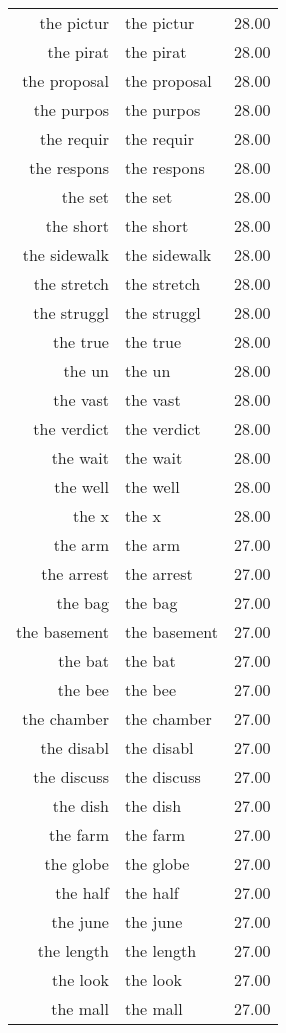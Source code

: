 \begin{table}[ht]
\begin{tabular}{rlr}
  the pictur & the pictur & 28.00 \\ 
  the pirat & the pirat & 28.00 \\ 
  the proposal & the proposal & 28.00 \\ 
  the purpos & the purpos & 28.00 \\ 
  the requir & the requir & 28.00 \\ 
  the respons & the respons & 28.00 \\ 
  the set & the set & 28.00 \\ 
  the short & the short & 28.00 \\ 
  the sidewalk & the sidewalk & 28.00 \\ 
  the stretch & the stretch & 28.00 \\ 
  the struggl & the struggl & 28.00 \\ 
  the true & the true & 28.00 \\ 
  the un & the un & 28.00 \\ 
  the vast & the vast & 28.00 \\ 
  the verdict & the verdict & 28.00 \\ 
  the wait & the wait & 28.00 \\ 
  the well & the well & 28.00 \\ 
  the x & the x & 28.00 \\ 
  the arm & the arm & 27.00 \\ 
  the arrest & the arrest & 27.00 \\ 
  the bag & the bag & 27.00 \\ 
  the basement & the basement & 27.00 \\ 
  the bat & the bat & 27.00 \\ 
  the bee & the bee & 27.00 \\ 
  the chamber & the chamber & 27.00 \\ 
  the disabl & the disabl & 27.00 \\ 
  the discuss & the discuss & 27.00 \\ 
  the dish & the dish & 27.00 \\ 
  the farm & the farm & 27.00 \\ 
  the globe & the globe & 27.00 \\ 
  the half & the half & 27.00 \\ 
  the june & the june & 27.00 \\ 
  the length & the length & 27.00 \\ 
  the look & the look & 27.00 \\ 
  the mall & the mall & 27.00 \\ 

\end{tabular}
\end{table}
